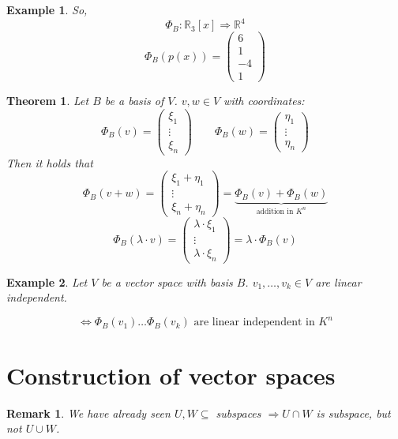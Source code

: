 \documentclass[a4paper,landscape,twocolumn]{article}
\newtheorem{theorem}{Theorem}
\newtheorem{ex}{Example}
\newtheorem{rem}{Remark}
\begin{document}
\begin{ex}
  So,
  \[ \Phi_B: \mathbb R_3[x] \Rightarrow \mathbb R^4 \]
  \[ \Phi_B(p(x)) = \begin{pmatrix} 6 \\ 1 \\ -4 \\ 1 \end{pmatrix} \]
\end{ex}

\begin{theorem}
  \label{satz-3-38}
  Let $B$ be a basis of $V$.
  $v, w \in V$ with coordinates:
  \[ \Phi_B(v) = \begin{pmatrix} \xi_1 \\ \vdots \\ \xi_n \end{pmatrix} \qquad \Phi_B(w) = \begin{pmatrix} \eta_1 \\ \vdots \\ \eta_n \end{pmatrix} \]
  Then it holds that
  \[ \Phi_B(v+w) = \begin{pmatrix} \xi_1 + \eta_1 \\ \vdots \\ \xi_n + \eta_n \end{pmatrix} = \underbrace{\Phi_B(v) + \Phi_B(w)}_{\text{addition in } K^n} \]
  \[ \Phi_B(\lambda \cdot v) = \begin{pmatrix} \lambda \cdot \xi_1 \\ \vdots \\ \lambda \cdot \xi_n \end{pmatrix} = \lambda \cdot \Phi_B(v) \]
\end{theorem}

\begin{ex}
  \label{ex-3-39}
  Let $V$ be a vector space with basis $B$.
  $v_1, \dots, v_k \in V$ are linear independent.

  \[ \Leftrightarrow \Phi_B(v_1) \dots \Phi_B(v_k) \text{ are linear independent in } K^n \]
\end{ex}

\section{Construction of vector spaces}

\begin{rem}
  We have already seen $U, W \subseteq$ subspaces
  $\Rightarrow U \cap W$ is subspace, but not $U \cup W$.
\end{rem}
\end{document}
